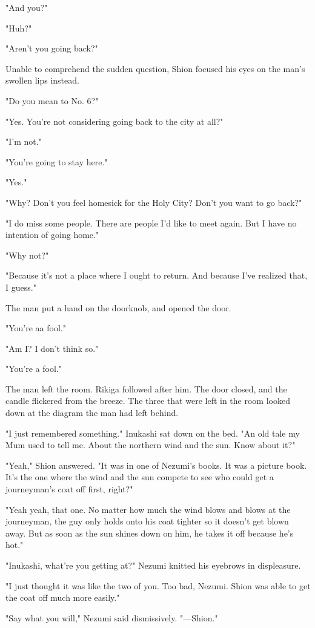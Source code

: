 "And you?"

"Huh?"

"Aren't you going back?"

Unable to comprehend the sudden question, Shion focused his eyes on the
man's swollen lips instead.

"Do you mean to No. 6?"

"Yes. You're not considering going back to the city at all?"

"I'm not."

"You're going to stay here."

"Yes."

"Why? Don't you feel homesick for the Holy City? Don't you want to go
back?"

"I do miss some people. There are people I'd like to meet again. But I
have no intention of going home."

"Why not?"

"Because it's not a place where I ought to return. And because I've
realized that, I guess."

The man put a hand on the doorknob, and opened the door.

"You're a\el a fool."

"Am I? I don't think so."

"You're a fool."

The man left the room. Rikiga followed after him. The door closed, and
the candle flickered from the breeze. The three that were left in the
room looked down at the diagram the man had left behind.

"I just remembered something." Inukashi sat down on the bed. "An old
tale my Mum used to tell me. About the northern wind and the sun. Know
about it?"

"Yeah," Shion answered. "It was in one of Nezumi's books. It was a
picture book. It's the one where the wind and the sun compete to see who
could get a journeyman's coat off first, right?"

"Yeah yeah, that one. No matter how much the wind blows and blows at the
journeyman, the guy only holds onto his coat tighter so it doesn't get
blown away. But as soon as the sun shines down on him, he takes it off
because he's hot."

"Inukashi, what're you getting at?" Nezumi knitted his eyebrows in
displeasure.

"I just thought it was like the two of you. Too bad, Nezumi. Shion was
able to get the coat off much more easily."

"Say what you will," Nezumi said dismissively. "---Shion."

